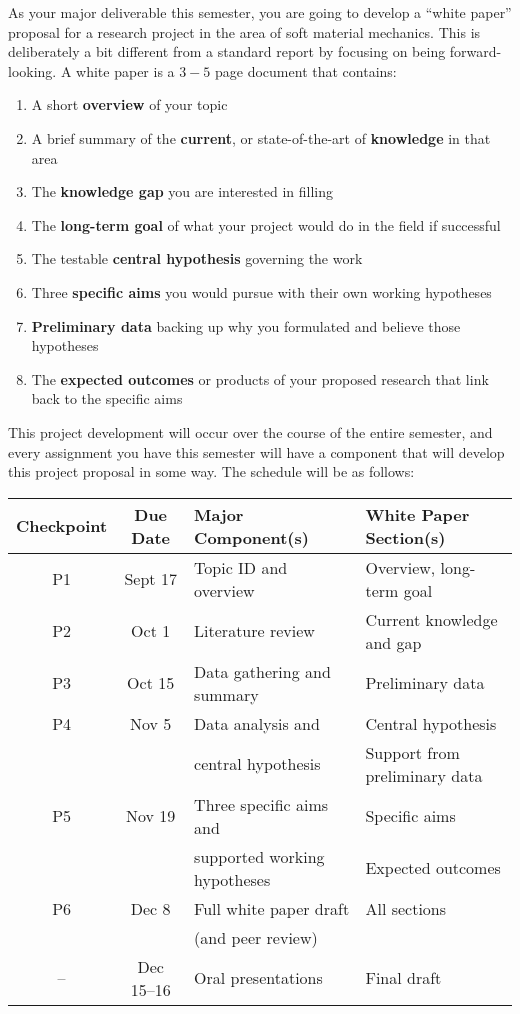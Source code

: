 \documentclass[preprint,12pt,authoryear]{elsarticle}
\begin{document}
As your major deliverable this semester, you are going to develop a ``white paper'' proposal for a research project in the area of soft material mechanics. 
This is deliberately a bit different from a standard report by focusing on being forward-looking. 
A white paper is a $3-5$ page document that contains:
\begin{enumerate}
    \item A short \textbf{overview} of your topic
    \item A brief summary of the \textbf{current}, or state-of-the-art of \textbf{knowledge} in that area
    \item The \textbf{knowledge gap} you are interested in filling
    \item The \textbf{long-term goal} of what your project would do in the field if successful
    \item The testable \textbf{central hypothesis} governing the work
    \item Three \textbf{specific aims} you would pursue with their own working hypotheses
    \item \textbf{Preliminary data} backing up why you formulated and believe those hypotheses
    \item The \textbf{expected outcomes} or products of your proposed research that link back to the specific aims  
\end{enumerate}

This project development will occur over the course of the entire semester, and every assignment you have this semester will have a component that will develop this project proposal in some way. 
The schedule will be as follows:
\smallskip

\footnotesize
\begin{tabularx}{\textwidth}{ccXX}

\textbf{Checkpoint} & \textbf{Due Date} & \textbf{Major Component(s)} & \textbf{White Paper Section(s)} \\
\hline
\hline
P1 & Sept 17 & Topic ID and overview & Overview, long-term goal \\
\hline
P2 & Oct 1 & Literature review & Current knowledge and gap \\
\hline
P3 & Oct 15 & Data gathering and summary & Preliminary data \\
\hline
P4 & Nov 5 & Data analysis and & Central hypothesis \\
 &  & central hypothesis & Support from preliminary data \\
\hline
P5 & Nov 19 & Three specific aims and & Specific aims \\
 & & supported working hypotheses & Expected outcomes \\
\hline
P6 & Dec 8 & Full white paper draft & All sections \\
 &  & (and peer review) &  \\
\hline
-- & Dec 15--16 & Oral presentations & Final draft \\
\hline
\end{tabularx}
\normalsize
\end{document}
